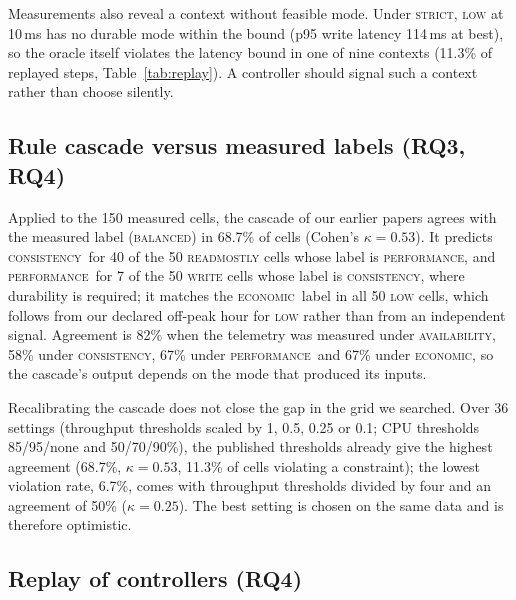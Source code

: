 \documentclass[preprint,12pt]{elsarticle}
\newcommand{\perf}{\textsc{performance}}
\newcommand{\cons}{\textsc{consistency}}
\newcommand{\avail}{\textsc{availability}}
\newcommand{\econ}{\textsc{economic}}
\begin{document}
Measurements also reveal a context without feasible mode. Under \textsc{strict}, \textsc{low} at 10\,ms has no durable mode within the bound (p95 write latency 114\,ms at best), so the oracle itself violates the latency bound in one of nine contexts (11.3\% of replayed steps, Table~\ref{tab:replay}). A controller should signal such a context rather than choose silently.

\subsection{Rule cascade versus measured labels (RQ3, RQ4)}
Applied to the 150 measured cells, the cascade of our earlier papers agrees with the measured label (\textsc{balanced}) in 68.7\% of cells (Cohen's $\kappa=0.53$). It predicts \cons\ for 40 of the 50 \textsc{readmostly} cells whose label is \perf, and \perf\ for 7 of the 50 \textsc{write} cells whose label is \cons, where durability is required; it matches the \econ\ label in all 50 \textsc{low} cells, which follows from our declared off-peak hour for \textsc{low} rather than from an independent signal. Agreement is 82\% when the telemetry was measured under \avail, 58\% under \cons, 67\% under \perf\ and 67\% under \econ, so the cascade's output depends on the mode that produced its inputs.

Recalibrating the cascade does not close the gap in the grid we searched. Over 36 settings (throughput thresholds scaled by 1, 0.5, 0.25 or 0.1; CPU thresholds 85/95/none and 50/70/90\%), the published thresholds already give the highest agreement (68.7\%, $\kappa=0.53$, 11.3\% of cells violating a constraint); the lowest violation rate, 6.7\%, comes with throughput thresholds divided by four and an agreement of 50\% ($\kappa=0.25$). The best setting is chosen on the same data and is therefore optimistic. 

\subsection{Replay of controllers (RQ4)}
\begin{table}[t]
\centering\small
\resizebox{\textwidth}{!}{}
\caption{Replay of 300 random traces of 24 steps: share of steps violating durability, HA or the 100\,ms latency bound under each declared policy (percentile bootstrap intervals over traces). Cost and switches are given for the \textsc{balanced} policy.}\label{tab:replay}
\end{table}
\end{document}
